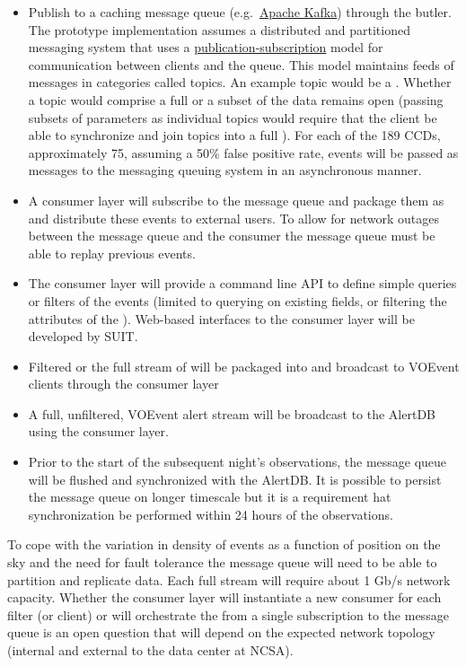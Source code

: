 \begin{itemize}
\item Publish \DIAObjects to a caching message queue (e.g.\ \hyperref[http://kafka.apache.org]{Apache Kafka}) through the butler. The prototype implementation assumes a distributed and partitioned messaging system that uses a \hyperref[https://en.wikipedia.org/wiki/Publish_subscribe_pattern]{publication-subscription} model for communication between clients and the queue. This model maintains feeds of messages in categories called topics. An example topic would be a \DIAObject. Whether a topic would comprise a full \DIAObject or a subset of the data remains open (passing subsets of parameters as individual topics would require that the client be able to synchronize and join topics into a full \DIAObject). For each of the 189 CCDs, approximately 75, assuming a 50\% false positive rate, events will be passed as messages to the messaging queuing system in an asynchronous manner.
\item A consumer layer will subscribe to the  message queue and package them as \VOEvents and distribute these events to external users. To allow for network outages between the message queue and the consumer the message queue must be able to replay previous events. 
\item  The consumer layer will provide a command line API to define simple queries or filters of the events (limited to querying on existing \DIAObject fields, or filtering the attributes of the \DIAObject). Web-based interfaces to the consumer layer will be developed by SUIT. 
\item Filtered or the full stream of \DIAObjects will be packaged into \VOEvents and broadcast to VOEvent clients through the consumer layer
\item A full, unfiltered, VOEvent alert stream will be broadcast to the AlertDB using the consumer layer. 
\item Prior to the start of the subsequent night's observations, the message queue will be flushed and synchronized with the AlertDB. It is possible to persist the message queue on longer timescale but it is a requirement hat synchronization be performed within 24 hours of the observations.
\end{itemize}


To cope with the variation in density of events as a function of position on the sky and the need for fault tolerance the message queue will need to be able to partition and replicate data. Each full \DIAObject stream will require about 1 Gb/s network capacity. Whether the consumer layer will instantiate a new consumer for each filter (or client) or will orchestrate the \VOEvents from a single subscription to the message queue is an open question that will depend on the expected network topology (internal and external to the data center at NCSA).

